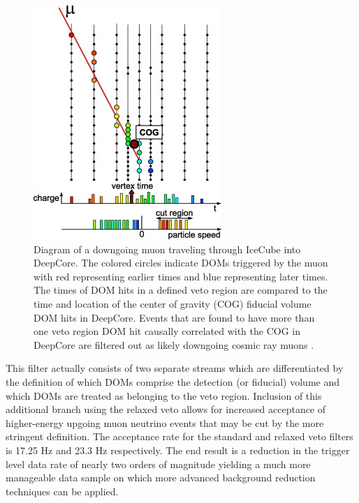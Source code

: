 \documentclass{gatech-thesis}
\begin{document}
\begin{figure}[ht]
  \begin{center}
    \includegraphics[width=.5\textwidth,keepaspectratio]{DeepCoreVeto.jpg}
  \end{center}
  \caption{Diagram of a downgoing muon traveling through IceCube into DeepCore. The colored circles indicate DOMs triggered by the muon with red representing earlier times and blue representing later times. The times of DOM hits in a defined veto region are compared to the time and location of the center of gravity (COG) fiducial volume DOM hits in DeepCore. Events that are found to have more than one veto region DOM hit causally correlated with the COG in DeepCore are filtered out as likely downgoing cosmic ray muons \cite{2012APh....35..615A}.}
  \label{fig:DCVetoSketch}
\end{figure}

This filter actually consists of two separate streams which are differentiated by the definition of which DOMs comprise the detection (or fiducial) volume and which DOMs are treated as belonging to the veto region. Inclusion of this additional branch using the relaxed veto allows for increased acceptance of higher-energy upgoing muon neutrino events that may be cut by the more stringent definition. The acceptance rate for the standard and relaxed veto filters is 17.25 Hz and 23.3 Hz respectively. The end result is a reduction in the trigger level data rate of nearly two orders of magnitude yielding a much more manageable data sample on which more advanced background reduction techniques can be applied.
\end{document}
